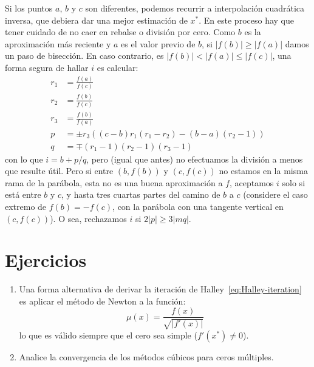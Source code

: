   Si los puntos \(a\), \(b\) y \(c\) son diferentes,
  podemos recurrir a interpolación cuadrática inversa,
  que debiera dar una mejor estimación de \(x^*\).
  En este proceso hay que tener cuidado
  de no caer en rebalse o división por cero.
  Como \(b\) es la aproximación más reciente
  y \(a\) es el valor previo de \(b\),
  si \(\lvert f(b) \rvert \ge \lvert f(a) \rvert\)
  damos un paso de bisección.
  En caso contrario,
  es \(\lvert f(b) \rvert < \lvert f(a) \rvert \le \lvert f(c) \rvert\),
  una forma segura de hallar \(i\) es calcular:
  \begin{align*}
    r_1
      &= \frac{f(a)}{f(c)} \\
    r_2
      &= \frac{f(b)}{f(c)} \\
    r_3
      &= \frac{f(b)}{f(a)} \\
    p
      &= \pm r_3 ((c - b) r_1 (r_1 - r_2) - (b - a) (r_2 - 1)) \\
    q
      &= \mp (r_1 - 1) (r_2 - 1) (r_3 - 1)
  \end{align*}
  con lo que \(i = b + p / q\),
  pero
  (igual que antes)
  no efectuamos la división a menos que resulte útil.
  Pero si entre \((b, f(b))\) y \((c, f(c))\)
  no estamos en la misma rama de la parábola,
  esta no es una buena aproximación a \(f\),
  aceptamos \(i\) solo si está entre \(b\) y \(c\),
  y hasta tres cuartas partes del camino de \(b\) a \(c\)
  (considere el caso extremo de \(f(b) = - f(c)\),
   con la parábola con una tangente vertical en \((c, f(c))\)).
  O sea,
  rechazamos \(i\) si \(2 \lvert p \rvert \ge 3 \lvert m q \rvert\).

\section*{Ejercicios}
\label{sec:ejercicios-other-zeros}

  \begin{enumerate}
  \item
    Una forma alternativa
    de derivar la iteración de Halley~\eqref{eq:Halley-iteration}
    es aplicar el método de Newton a la función:
    \begin{equation*}
      \mu(x)
        = \frac{f(x)}{\sqrt{\lvert f'(x) \rvert}}
    \end{equation*}
    lo que es válido siempre que el cero sea simple
    (\(f'(x^*) \ne 0\)).
  \item
    Analice la convergencia de los métodos cúbicos para ceros múltiples.
  \end{enumerate}




